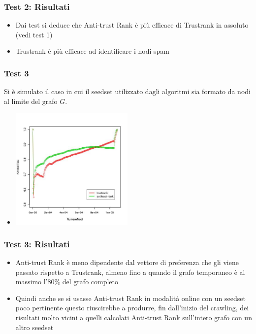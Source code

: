 \documentclass{beamer}
\begin{document}
\begin{frame}
\frametitle{Test 2: Risultati}
\begin{itemize}
 \item<1-> Dai test si deduce che  Anti-trust Rank è più efficace di Trustrank in assoluto (vedi test 1) 
 \item<2-> Trustrank è più efficace ad identificare i nodi spam
 \end{itemize}
\end{frame}
\begin{frame}
 \frametitle{Test 3}
 Si è  simulato il caso in cui il seedset  utilizzato dagli algoritmi sia formato da nodi al limite del grafo \(G\).
 \begin{itemize}
  \item<2-> \begin{center}
 \includegraphics[height=6cm]{immagini/test3/coplotTrustAnti_Mode1_set3776_62}
\end{center}
 \end{itemize}
\end{frame}
\begin{frame}
\frametitle{Test 3: Risultati}
\begin{itemize}
 \item<1-> Anti-trust Rank è meno dipendente dal vettore di preferenza che gli viene passato rispetto a Trustrank, almeno fino a quando il grafo temporaneo è al massimo l'80\% del grafo completo
 \item<2-> Quindi anche se si usasse Anti-trust Rank in modalità online con un seedset poco pertinente questo riuscirebbe a produrre, fin dall'inizio del crawling, dei risultati molto vicini a quelli calcolati Anti-trust Rank sull'intero grafo con un altro seedset
 \end{itemize}
\end{frame}
\end{document}
